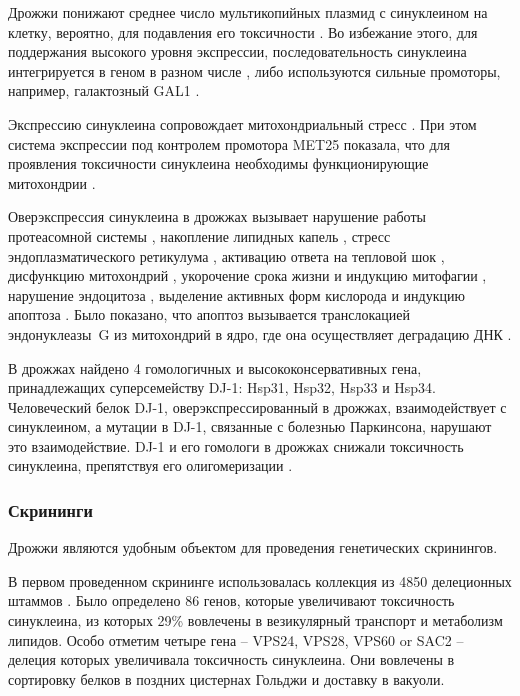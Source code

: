 Дрожжи понижают среднее число  мультикопийных плазмид с синуклеином на клетку, вероятно, для подавления его токсичности \cite{outeiro_yeast_2003}. Во избежание этого, для поддержания высокого уровня экспрессии, последовательность синуклеина интегрируется в геном в разном числе \cite{cooper_-synuclein_2006, su_compounds_2010}, либо используются сильные промоторы, например, галактозный GAL1 \cite{outeiro_yeast_2003}.

 Экспрессию синуклеина сопровождает митохондриальный стресс \cite{su_compounds_2010}. 
При этом система экспрессии под контролем промотора MET25 показала, что для проявления токсичности синуклеина необходимы функционирующие митохондрии \cite{buttner_functional_2008}.  

Оверэкспрессия синуклеина в дрожжах вызывает нарушение работы протеасомной системы \cite{outeiro_yeast_2003}, 
	накопление липидных капель \cite{outeiro_yeast_2003},
	стресс эндоплазматического ретикулума \cite{cooper_-synuclein_2006},
	активацию ответа на тепловой шок \cite{yeger-lotem_bridging_2009},
	дисфункцию митохондрий \cite{su_compounds_2010},
	укорочение срока жизни и индукцию митофагии \cite{sampaio-marques_snca_2012},
	нарушение эндоцитоза \cite{outeiro_yeast_2003},
	выделение активных форм кислорода и индукцию апоптоза \cite{su_compounds_2010, flower_ygr198w_2007}. 
	Было показано, что апоптоз вызывается транслокацией эндонуклеазы~G из митохондрий в ядро, где она осуществляет деградацию ДНК \cite{buttner_endonuclease_2013}.
	

В дрожжах найдено 4 гомологичных и высококонсервативных гена, принадлежащих суперсемейству DJ-1:  Hsp31, Hsp32, Hsp33 и Hsp34. Человеческий белок DJ-1, оверэкспрессированный в дрожжах, взаимодействует с синуклеином, а мутации в DJ-1, связанные с болезнью Паркинсона, нарушают это взаимодействие. DJ-1 и его гомологи в дрожжах снижали токсичность синуклеина, препятствуя его олигомеризации \cite{zondler_dj-1_2014}. 



\subsubsection{Скрининги}

Дрожжи являются удобным объектом для проведения генетических скринингов.

В первом проведенном скрининге использовалась коллекция из 4850 делеционных штаммов \cite{willingham_yeast_2003}. Было определено 86 генов, которые увеличивают токсичность синуклеина, из которых 29\% вовлечены в везикулярный транспорт и метаболизм липидов.
Особо отметим четыре гена -- VPS24, VPS28, VPS60 or SAC2 -- делеция которых увеличивала токсичность синуклеина. Они вовлечены в сортировку белков в поздних цистернах Гольджи и доставку в вакуоли. 

